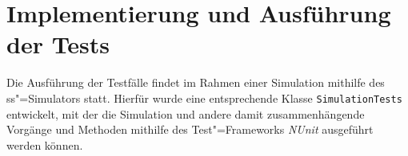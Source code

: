 \chapter{Implementierung und Ausführung der Tests}
\label{chap:testExecution}

Die Ausführung der Testfälle findet im Rahmen einer Simulation mithilfe des \ac{ss}"=Simulators statt.
Hierfür wurde eine entsprechende Klasse \texttt{SimulationTests} entwickelt, mit der die Simulation und andere damit zusammenhängende Vorgänge und Methoden mithilfe des Test"=Frameworks \emph{NUnit} ausgeführt werden können.








